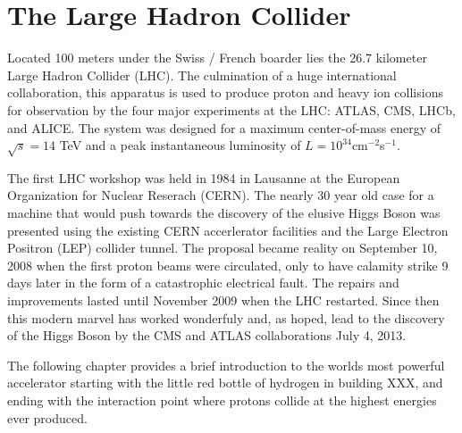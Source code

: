 \chapter{The Large Hadron Collider} \label{chap:lhc}

Located 100 meters under the Swiss / French boarder lies the 26.7 kilometer
Large Hadron Collider (LHC).  The culmination of a huge international collaboration,
this apparatus is used to produce proton and heavy ion collisions for observation by
the four major experiments at the LHC: ATLAS, CMS, LHCb, and ALICE.  The system
was designed for a maximum center-of-mass  energy of $\sqrt{s} = 14$ TeV and a peak
instantaneous luminosity of $L = 10^{34} $cm$^{-2} $s$^{-1}$.  

The first LHC workshop was held in 1984 in Lausanne at the European Organization
for  Nuclear Reserach (CERN).  The nearly 30 year old case for a machine that 
would push towards the discovery of the elusive Higgs Boson was presented using
the existing CERN accerlerator facilities and the Large Electron Positron (LEP)
collider tunnel. The proposal became reality on September 10, 2008 when the
first proton beams were circulated, only to have calamity strike 9 days later in
the form of a catastrophic electrical fault. The repairs and improvements lasted
until November 2009 when the LHC restarted.  Since then this modern marvel has
worked wonderfuly and, as hoped, lead to the discovery of the Higgs Boson by the
CMS and ATLAS collaborations July 4, 2013.

The following  chapter provides a brief introduction to the worlds
most powerful accelerator starting with the little red bottle of hydrogen in 
building XXX, and ending with the interaction point where protons collide at the 
highest energies ever produced.




